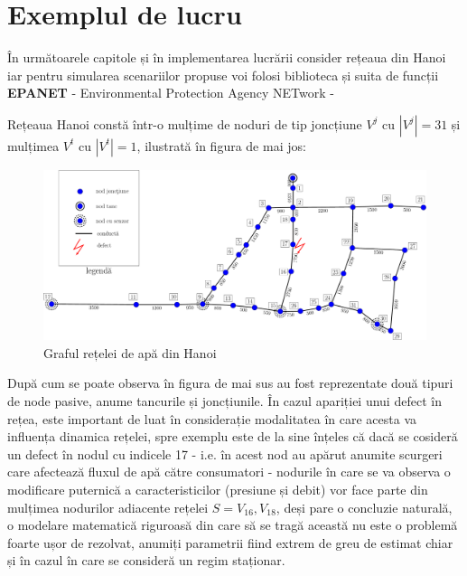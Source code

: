 \section{Exemplul de lucru}
În următoarele capitole și în implementarea lucrării consider rețeaua din Hanoi iar pentru simularea scenariilor propuse voi folosi biblioteca și suita de funcții \textbf{EPANET} - Environmental Protection Agency NETwork - \cite{rossman2000epanet}

Rețeaua Hanoi constă într-o mulțime de noduri de tip joncțiune $V^j$ cu $|V^j| = 31$ și mulțimea $V^t$ cu $|V^t|=1$, ilustrată în figura de mai jos:
 
\begin{figure}[h]
\centering
\includegraphics[width=\textwidth]{pics/c1_pics/hanoi_network.pdf}
\caption{Graful rețelei de apă din Hanoi}
\end{figure}

După cum se poate observa în figura de mai sus au fost reprezentate două tipuri de node pasive, anume tancurile și joncțiunile. În cazul apariției unui defect în rețea, este important de luat în considerație modalitatea în care acesta va influența dinamica rețelei, spre exemplu este de la sine înțeles că dacă se cosideră un defect în nodul cu indicele 17 - i.e. în acest nod au apărut anumite scurgeri care afectează fluxul de apă către consumatori - nodurile în care se va observa o modificare puternică a caracteristicilor (presiune și debit) vor face parte din mulțimea nodurilor adiacente rețelei $S={V_{16}, V_{18}}$, deși pare o concluzie naturală, o modelare matematică riguroasă din care să se tragă această nu este o problemă foarte ușor de rezolvat, anumiți parametrii fiind extrem de greu de estimat chiar și în cazul în care se consideră un regim staționar.

